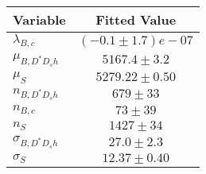 \begin{tabular}[t]{lc}
\hline
Variable &Fitted Value\\
\hline\hline
$\lambda_{B,c}$&$(-0.1\pm1.7)e-07$\\
\hline
$\mu_{B, D^* D_s h}$&$5167.4\pm3.2$\\
\hline
$\mu_S$&$5279.22\pm0.50$\\
\hline
$n_{B, D^* D_s h}$&$679\pm33$\\
\hline
$n_{B,c}$&$73\pm39$\\
\hline
$n_S$&$1427\pm34$\\
\hline
$\sigma_{B, D^* D_s h}$&$27.0\pm2.3$\\
\hline
$\sigma_S$&$12.37\pm0.40$\\
\hline
\end{tabular}